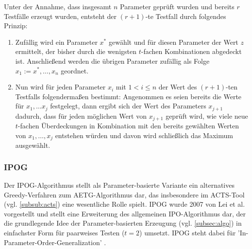 Unter der Annahme, dass insgesamt $n$ Parameter geprüft wurden und bereits $r$ Testfälle erzeugt wurden, entsteht der $(r+1)$-te Testfall durch folgendes Prinzip:
\begin{enumerate}
\item Zufällig wird ein Parameter $x^*$ gewählt und für diesen Parameter der Wert $z$ ermittelt, der bisher durch die wenigsten $t$-fachen Kombinationen abgedeckt ist. Anschließend werden die übrigen Parameter zufällig als Folge $x_1 := x^*, \dots, x_n$ geordnet.
\item Nun wird für jeden Parameter $x_i$ mit $1 < i \leq n$ der Wert des $(r+1)$-ten Testfalls folgendermaßen bestimmt: Angenommen es seien bereits die Werte für $x_1, \dots x_j$ festgelegt, dann ergibt sich der Wert des Parameters $x_{j+1}$ dadurch, dass für jeden möglichen Wert von $x_{j+1}$ geprüft wird, wie viele neue $t$-fachen Überdeckungen in Kombination mit den bereits gewählten Werten von $x_1, \dots, x_j$ entstehen würden und davon wird schließlich das Maximum ausgewählt.
\end{enumerate} 

\subsubsection{IPOG}\label{subsub:ipog}

Der IPOG-Algorithmus stellt als Parameter-basierte Variante ein alternatives Greedy-Verfahren zum AETG-Algorithmus dar, das insbesondere im ACTS-Tool (vgl. \autoref{subsub:acts}) eine wesentliche Rolle spielt. IPOG wurde 2007 von Lei et al. \cite{lei2008ipog} vorgestellt und stellt eine Erweiterung des allgemeinen IPO-Algorithmus \cite{lei1998parameter} dar, der die grundlegende Idee der Parameter-basierten Erzeugung (vgl. \autoref{subsec:algo}) in einfachster Form für paarweises Testen ($t=2$) umsetzt. IPOG steht dabei für 'In-Parameter-Order-Generalization' \cite{lei2008ipog}. 

